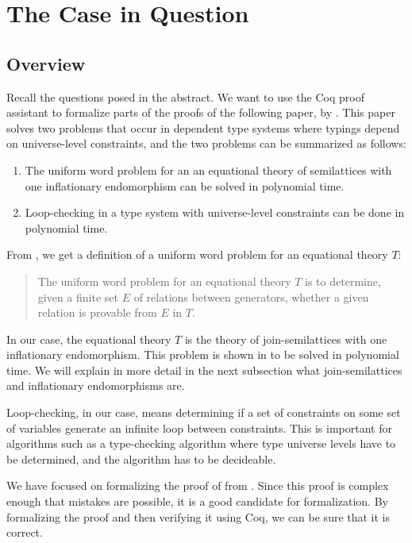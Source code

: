 \chapter{The Case in Question}
\label{ch:the_case_in_question}

\section{Overview}
\label{sec:overview}

Recall the questions posed in the abstract.
We want to use the Coq proof assistant to formalize parts of the proofs of the following paper, by \citeauthor{mbezem} \cite{mbezem}.
This paper solves two problems that occur in dependent type systems where typings depend
on universe-level constraints, and the two problems can be summarized as follows:

\begin{enumerate}
    \item The uniform word problem for an an equational theory of semilattices
          with one inflationary endomorphism can be solved in polynomial time.
    \item Loop-checking in a type system with universe-level constraints
          can be done in polynomial time.
\end{enumerate}

From \cite{mbezem}, we get a definition of a uniform word problem for an equational theory $T$:

\begin{quote}
The uniform word problem for an equational theory $T$ is to determine,
given a finite set $E$ of relations between generators,
whether a given relation is provable from $E$ in $T$.
\end{quote}
In our case, the equational theory $T$ is the theory of join-semilattices
with one inflationary endomorphism.
This problem is shown in \cite{mbezem} to be solved in polynomial time.
We will explain in more detail in the next subsection what join-semilattices
and inflationary endomorphisms are.

Loop-checking, in our case, means determining if a set of constraints
on some set of variables generate an infinite loop between constraints.
This is important for algorithms such as a type-checking algorithm where
type universe levels have to be determined, and the algorithm has to be decideable.

We have focused on formalizing the proof of  from \cite{mbezem}.
Since this proof is complex enough that mistakes are possible, it is a good candidate for formalization.
By formalizing the proof and then verifying it using Coq, we can be sure that it is correct.


